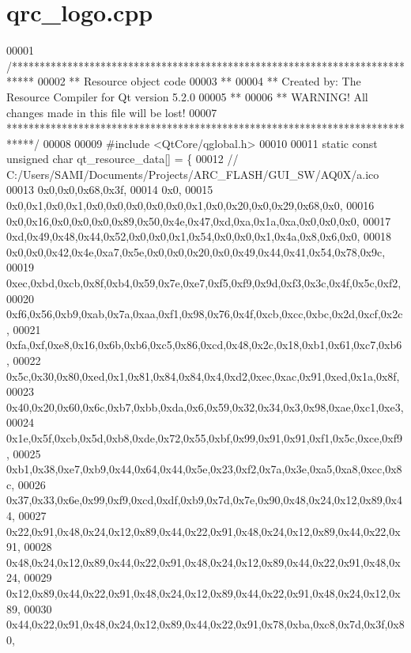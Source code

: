 \hypertarget{a00126_source}{\section{qrc\+\_\+logo.\+cpp}
\label{a00126_source}
}

\begin{DoxyCode}
00001 \textcolor{comment}{/****************************************************************************}
00002 \textcolor{comment}{** Resource object code}
00003 \textcolor{comment}{**}
00004 \textcolor{comment}{** Created by: The Resource Compiler for Qt version 5.2.0}
00005 \textcolor{comment}{**}
00006 \textcolor{comment}{** WARNING! All changes made in this file will be lost!}
00007 \textcolor{comment}{*****************************************************************************/}
00008 
00009 \textcolor{preprocessor}{#include <QtCore/qglobal.h>}
00010 
00011 \textcolor{keyword}{static} \textcolor{keyword}{const} \textcolor{keywordtype}{unsigned} \textcolor{keywordtype}{char} qt\_resource\_data[] = \{
00012   \textcolor{comment}{// C:/Users/SAMI/Documents/Projects/ARC\_FLASH/GUI\_SW/AQ0X/a.ico}
00013   0x0,0x0,0x68,0x3f,
00014   0x0,
00015   0x0,0x1,0x0,0x1,0x0,0x0,0x0,0x0,0x0,0x1,0x0,0x20,0x0,0x29,0x68,0x0,
00016   0x0,0x16,0x0,0x0,0x0,0x89,0x50,0x4e,0x47,0xd,0xa,0x1a,0xa,0x0,0x0,0x0,
00017   0xd,0x49,0x48,0x44,0x52,0x0,0x0,0x1,0x54,0x0,0x0,0x1,0x4a,0x8,0x6,0x0,
00018   0x0,0x0,0x42,0x4e,0xa7,0x5e,0x0,0x0,0x20,0x0,0x49,0x44,0x41,0x54,0x78,0x9c,
00019   0xec,0xbd,0xcb,0x8f,0xb4,0x59,0x7e,0xe7,0xf5,0xf9,0x9d,0xf3,0x3c,0x4f,0x5c,0xf2,
00020   0xf6,0x56,0xb9,0xab,0x7a,0xaa,0xf1,0x98,0x76,0x4f,0xcb,0xcc,0xbc,0x2d,0xcf,0x2c,
00021   0xfa,0xf,0xe8,0x16,0x6b,0xb6,0xc5,0x86,0xcd,0x48,0x2c,0x18,0xb1,0x61,0xc7,0xb6,
00022   0x5c,0x30,0x80,0xed,0x1,0x81,0x84,0x84,0x4,0xd2,0xec,0xac,0x91,0xed,0x1a,0x8f,
00023   0x40,0x20,0x60,0x6c,0xb7,0xbb,0xda,0x6,0x59,0x32,0x34,0x3,0x98,0xae,0xc1,0xe3,
00024   0x1e,0x5f,0xcb,0x5d,0xb8,0xde,0x72,0x55,0xbf,0x99,0x91,0x91,0xf1,0x5c,0xce,0xf9,
00025   0xb1,0x38,0xe7,0xb9,0x44,0x64,0x44,0x5e,0x23,0xf2,0x7a,0x3e,0xa5,0xa8,0xcc,0x8c,
00026   0x37,0x33,0x6e,0x99,0xf9,0xcd,0xdf,0xb9,0x7d,0x7e,0x90,0x48,0x24,0x12,0x89,0x44,
00027   0x22,0x91,0x48,0x24,0x12,0x89,0x44,0x22,0x91,0x48,0x24,0x12,0x89,0x44,0x22,0x91,
00028   0x48,0x24,0x12,0x89,0x44,0x22,0x91,0x48,0x24,0x12,0x89,0x44,0x22,0x91,0x48,0x24,
00029   0x12,0x89,0x44,0x22,0x91,0x48,0x24,0x12,0x89,0x44,0x22,0x91,0x48,0x24,0x12,0x89,
00030   0x44,0x22,0x91,0x48,0x24,0x12,0x89,0x44,0x22,0x91,0x78,0xba,0xc8,0x7d,0x3f,0x80,

\end{DoxyCode}
